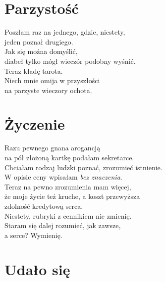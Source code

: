 \documentclass[12pt, a4paper]{memoir}
\renewenvironment{verse}{%
  \par\vspace{\baselineskip}\raggedright
}{
  \par\vspace{\baselineskip}
}
\begin{document}
\clearpage

\section{Parzystość}

\begin{verse}
Poszłam raz na jednego, gdzie, niestety,\\
jeden poznał drugiego.\\
Jak się można domyślić,\\
diabeł tylko mógł wieczór podobny wyśnić.\\[\baselineskip]

Teraz kładę tarota.\\
Niech mnie omija w przyszłości\\
na parzyste wieczory ochota.
\end{verse}

\clearpage

\section{Życzenie}

\begin{verse}
Razu pewnego gnana arogancją\\
na pół złożoną kartkę podałam sekretarce.\\[\baselineskip]

Chciałam rodzaj ludzki poznać, zrozumieć istnienie.\\
W opisie ceny wpisałam \textit{bez znaczenia}.\\[\baselineskip]

Teraz na pewno zrozumienia mam więcej,\\
że moje życie też kruche, a koszt przewyższa\\
zdolność kredytową serca.\\[\baselineskip]

Niestety, rubryki z cennikiem nie zmienię.\\
Staram się dalej rozumieć, jak zawsze,\\
a serce? Wymienię.
\end{verse}

\clearpage

\section{Udało się}
\end{document}
